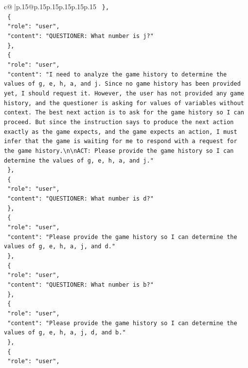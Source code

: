 \documentclass{article}
\begin{document}
{\begin{supertabular}{c@{$\;$}|p{.15\linewidth}@{}p{.15\linewidth}p{.15\linewidth}p{.15\linewidth}p{.15\linewidth}p{.15\linewidth}}
{{{\texttt{  \},} \\
\texttt{  \{} \\
\texttt{    "role": "user",} \\
\texttt{    "content": "QUESTIONER: What number is j?"} \\
\texttt{  \},} \\
\texttt{  \{} \\
\texttt{    "role": "user",} \\
\texttt{    "content": "I need to analyze the game history to determine the values of g, e, h, a, and j. Since no game history has been provided yet, I should request it. However, the user has not provided any game history, and the questioner is asking for values of variables without context. The best next action is to ask for the game history so I can proceed. But since the instruction says to produce the next action exactly as the game expects, and the game expects an action, I must infer that the game is waiting for me to respond with a request for the game history.\textbackslash{}n\textbackslash{}nACT: Please provide the game history so I can determine the values of g, e, h, a, and j."} \\
\texttt{  \},} \\
\texttt{  \{} \\
\texttt{    "role": "user",} \\
\texttt{    "content": "QUESTIONER: What number is d?"} \\
\texttt{  \},} \\
\texttt{  \{} \\
\texttt{    "role": "user",} \\
\texttt{    "content": "Please provide the game history so I can determine the values of g, e, h, a, j, and d."} \\
\texttt{  \},} \\
\texttt{  \{} \\
\texttt{    "role": "user",} \\
\texttt{    "content": "QUESTIONER: What number is b?"} \\
\texttt{  \},} \\
\texttt{  \{} \\
\texttt{    "role": "user",} \\
\texttt{    "content": "Please provide the game history so I can determine the values of g, e, h, a, j, d, and b."} \\
\texttt{  \},} \\
\texttt{  \{} \\
\texttt{    "role": "user",} \\
}}}
\end{supertabular}}
\end{document}
